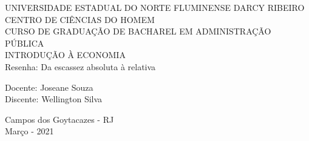 \begin{center}
    {\large UNIVERSIDADE ESTADUAL DO NORTE FLUMINENSE DARCY RIBEIRO}
    \\[0.2cm]
    {\large CENTRO DE CIÊNCIAS DO HOMEM}
    \\[0.2cm]
    {\large CURSO DE GRADUAÇÃO DE BACHAREL EM ADMINISTRAÇÃO PÚBLICA}
    \\[0.2cm]
    {\large INTRODUÇÃO À ECONOMIA}
    \\[8cm]
    { \huge Resenha: Da escassez absoluta à relativa}
    \\[4cm]
\end{center}

\begin{flushleft}
    Docente: Joseane Souza\\[.2cm]
    Discente: Wellington Silva\\[4cm]
\end{flushleft}

\begin{center}
    {\large Campos dos Goytacazes - RJ}\\[0.2cm]
    {\large Março - 2021}
\end{center}
